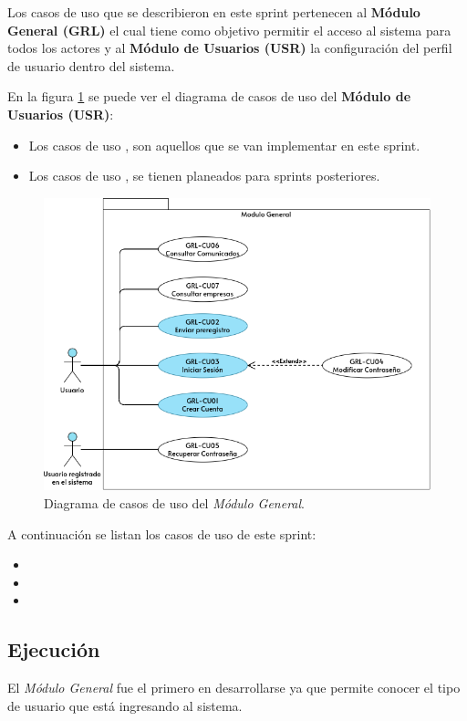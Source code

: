     Los casos de uso que se describieron en este sprint pertenecen al \textbf{Módulo General (GRL)} el cual tiene como objetivo 
    permitir el acceso al sistema para todos los actores y al \textbf{Módulo de Usuarios (USR)} la configuración del perfil de usuario dentro del sistema.

    En la figura \ref{dcu:MUSR} se puede ver el diagrama de casos de uso del \textbf{Módulo de Usuarios (USR)}:
    \begin{itemize}
        \item Los casos de uso \IUazul{} , son aquellos que se van implementar en este sprint.
        \item Los casos de uso \IUblanco{}, se tienen planeados para sprints posteriores.
    \end{itemize} 

   

    \begin{figure}[H]
        \begin{center}
            \includegraphics[width=.7\textwidth]{sprints/imagenes/CUGRL.png}
        \end{center}
        \caption{Diagrama de casos de uso del \textit{Módulo General}.}
        \label{dcu:MUSR}
    \end{figure}

    A continuación se listan los casos de uso de este sprint:
    \begin{itemize}
        \item {}
        \item {}
        \item {}
    \end{itemize} 


    \subsection{Ejecución}
        El \textit{Módulo General} fue el primero en desarrollarse ya que permite conocer el tipo de usuario
        que está ingresando al sistema.\\ 
        
